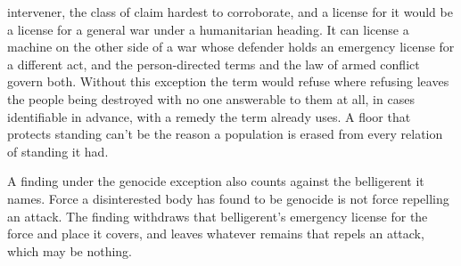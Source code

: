 intervener, the class of claim hardest to corroborate, and a license for it would be a license for a general war under a humanitarian heading. It can license a machine on the other side of a war whose defender holds an emergency license for a different act, and the person-directed terms and the law of armed conflict govern both. Without this exception the term would refuse where refusing leaves the people being destroyed with no one answerable to them at all, in cases identifiable in advance, with a remedy the term already uses. A floor that protects standing can't be the reason a population is erased from every relation of standing it had.

A finding under the genocide exception also counts against the belligerent it names. Force a disinterested body has found to be genocide is not force repelling an attack. The finding withdraws that belligerent's emergency license for the force and place it covers, and leaves whatever remains that repels an attack, which may be nothing.
